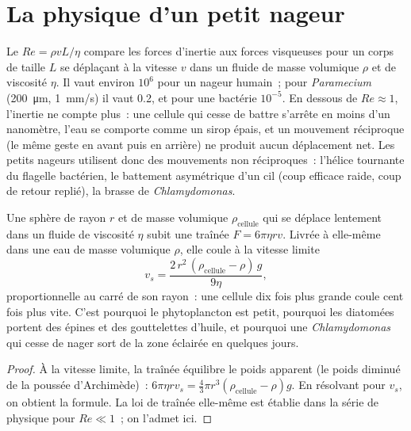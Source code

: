 \section{La physique d'un petit nageur}

\begin{proposition}\label{prop:b2:unicellular-diversity:reynolds}
Le \emph{} $Re = \rho v L/\eta$ compare les forces
d'inertie aux forces visqueuses pour un corps de taille $L$ se déplaçant
à la vitesse $v$ dans un fluide de masse volumique $\rho$ et de
viscosité $\eta$. Il vaut environ $10^6$ pour un nageur humain~; pour
\emph{Paramecium} (\qty{200}{\micro m}, \qty{1}{mm/s}) il vaut 0.2, et
pour une bactérie $10^{-5}$. En dessous de
$Re \approx 1$, l'inertie ne compte plus~: une cellule qui cesse de
battre s'arrête en moins d'un nanomètre, l'eau se comporte comme un
sirop épais, et un mouvement réciproque (le même geste en avant puis en
arrière) ne produit aucun déplacement net. Les petits nageurs utilisent
donc des mouvements non réciproques~: l'hélice tournante du flagelle
bactérien, le battement asymétrique d'un cil (coup efficace raide, coup
de retour replié), la brasse de \emph{Chlamydomonas}.
\end{proposition}

\begin{theorem}\label{thm:b2:unicellular-diversity:stokes}
Une sphère de rayon $r$ et de masse volumique $\rho_{\text{cellule}}$ qui
se déplace lentement dans un fluide de viscosité $\eta$ subit une
traînée $F = 6\pi\eta r v$. Livrée à elle-même dans une eau de masse
volumique $\rho$, elle coule à la vitesse limite
\[
v_s = \frac{2\,r^2\,(\rho_{\text{cellule}} - \rho)\,g}{9\eta},
\]
proportionnelle au carré de son rayon~: une cellule dix fois plus grande
coule cent fois plus vite. C'est pourquoi le phytoplancton est petit,
pourquoi les diatomées portent des épines et des gouttelettes d'huile,
et pourquoi une \emph{Chlamydomonas} qui cesse de nager sort de la zone
éclairée en quelques jours.
\end{theorem}
\begin{proof}
À la vitesse limite, la traînée équilibre le poids apparent (le poids
diminué de la poussée d'Archimède)~: $6\pi\eta r v_s = \tfrac{4}{3}\pi r^3
(\rho_{\text{cellule}} - \rho) g$. En résolvant pour $v_s$, on obtient la
formule. La loi de traînée elle-même est établie dans la série de
physique pour $Re \ll 1$~; on l'admet ici.
\end{proof}

